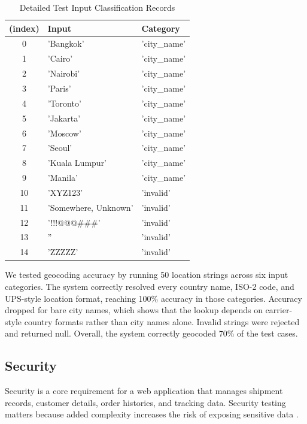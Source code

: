 \begin{table}[H]
\centering
\caption{Detailed Test Input Classification Records}
\label{tab:test-inputs}
\renewcommand{\arraystretch}{0.8} 
\begin{tabularx}{\textwidth}{c X >{\raggedright\arraybackslash}X}
\toprule
\textbf{(index)} & \textbf{Input} & \textbf{Category} \\
\midrule
0 & 'Bangkok' & 'city\_name' \\
1 & 'Cairo' & 'city\_name' \\
2 & 'Nairobi' & 'city\_name' \\
3 & 'Paris' & 'city\_name' \\
4 & 'Toronto' & 'city\_name' \\
5 & 'Jakarta' & 'city\_name' \\
6 & 'Moscow' & 'city\_name' \\
7 & 'Seoul' & 'city\_name' \\
8 & 'Kuala Lumpur' & 'city\_name' \\
9 & 'Manila' & 'city\_name' \\
10 & 'XYZ123' & 'invalid' \\
11 & 'Somewhere, Unknown' & 'invalid' \\
12 & '!!!@@@\#\#\#' & 'invalid' \\
13 & '' & 'invalid' \\
14 & 'ZZZZZ' & 'invalid' \\
\bottomrule
\end{tabularx}
\end{table}

We tested geocoding accuracy by running 50 location strings across six input categories. The system correctly resolved every country name, ISO-2 code, and UPS-style location format, reaching 100\% accuracy in those categories. Accuracy dropped for bare city names, which shows that the lookup depends on carrier-style country formats rather than city names alone. Invalid strings were rejected and returned null. Overall, the system correctly geocoded 70\% of the test cases.

\subsection{Security}

Security is a core requirement for a web application that manages shipment records, customer details, order histories, and tracking data. Security testing matters because added complexity increases the risk of exposing sensitive data \cite{jaiswal2014security}.




